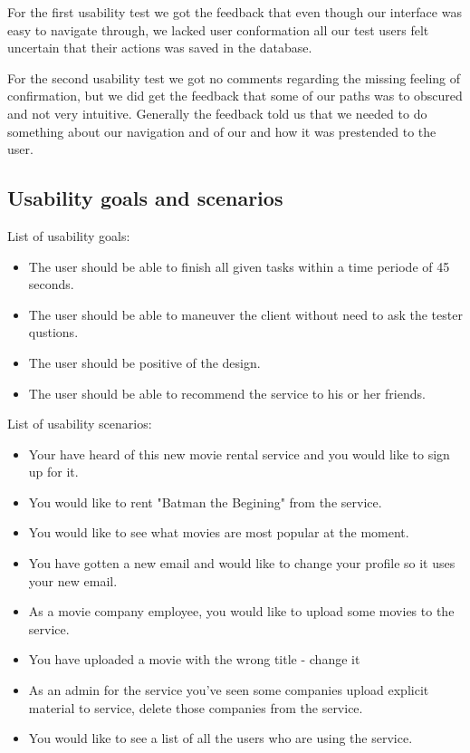 For the first usability test we got the feedback that even though our interface was easy to navigate through, we lacked user conformation all our test users felt uncertain that their actions was saved in the database.

For the second usability test we got no comments regarding the missing feeling of confirmation, but we did get the feedback that some of our paths was to obscured and not very intuitive. Generally the feedback told us that we needed to do something about our navigation and of our and how it was prestended to the user.


\subsection{Usability goals and scenarios}
\label{Appendix_Test_Usability_GoalsandScenario}
List of usability goals:
\begin{itemize}\addtolength{\itemsep}{-5pt}
\item The user should be able to finish all given tasks within a time periode of 45 seconds.
\item The user should be able to maneuver the client without need to ask the tester qustions.
\item The user should be positive of the design.
\item The user should be able to recommend the service to his or her friends.
\end {itemize}

List of usability scenarios:
\begin{itemize}\addtolength{\itemsep}{-5pt}
\item Your have heard of this new movie rental service and you would like to sign up for it.
\item You would like to rent "Batman the Begining" from the service.
\item You would like to see what movies are most popular at the moment.
\item You have gotten a new email and would like to change your profile so it uses your new email.
\item As a movie company employee, you would like to upload some movies to the service.
\item You have uploaded a movie with the wrong title - change it
\item As an admin for the service you've seen some companies upload explicit material to service, delete those companies from the service.
\item You would like to see a list of all the users who are using the service.
\end {itemize}

